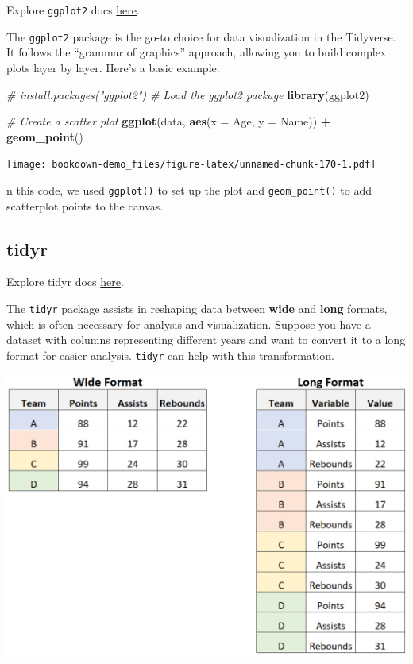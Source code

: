 \documentclass[
]{book}
\newenvironment{Shaded}{\begin{snugshade}}{\end{snugshade}}
\newcommand{\AttributeTok}[1]{\textcolor[rgb]{0.13,0.29,0.53}{#1}}
\newcommand{\CommentTok}[1]{\textcolor[rgb]{0.56,0.35,0.01}{\textit{#1}}}
\newcommand{\FunctionTok}[1]{\textcolor[rgb]{0.13,0.29,0.53}{\textbf{#1}}}
\newcommand{\NormalTok}[1]{#1}
\newcommand{\SpecialCharTok}[1]{\textcolor[rgb]{0.81,0.36,0.00}{\textbf{#1}}}
\begin{document}
Explore \texttt{ggplot2} docs \href{https://ggplot2.tidyverse.org/index.html}{here}.

The \texttt{ggplot2} package is the go-to choice for data visualization in the Tidyverse. It follows the ``grammar of graphics'' approach, allowing you to build complex plots layer by layer. Here's a basic example:

\begin{Shaded}
\begin{Highlighting}[]
\CommentTok{\# install.packages("ggplot2")}
\CommentTok{\# Load the ggplot2 package}
\FunctionTok{library}\NormalTok{(ggplot2)}

\CommentTok{\# Create a scatter plot}
\FunctionTok{ggplot}\NormalTok{(data, }\FunctionTok{aes}\NormalTok{(}\AttributeTok{x =}\NormalTok{ Age, }\AttributeTok{y =}\NormalTok{ Name)) }\SpecialCharTok{+}
  \FunctionTok{geom\_point}\NormalTok{()}
\end{Highlighting}
\end{Shaded}

\texttt{[image: bookdown-demo\_files/figure-latex/unnamed-chunk-170-1.pdf]}

n this code, we used \texttt{ggplot()} to set up the plot and \texttt{geom\_point()} to add scatterplot points to the canvas.

\hypertarget{tidyr}{%
\subsection{tidyr}\label{tidyr}}

Explore tidyr docs \href{https://tidyr.tidyverse.org/index.html}{here}.

The \texttt{tidyr} package assists in reshaping data between \textbf{wide} and \textbf{long} formats, which is often necessary for analysis and visualization. Suppose you have a dataset with columns representing different years and want to convert it to a long format for easier analysis. \texttt{tidyr} can help with this transformation.

\includegraphics[width=1\linewidth]{images/wide}
\end{document}
